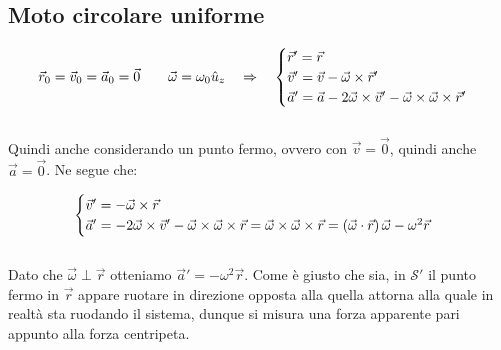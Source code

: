 \subsection{Moto circolare uniforme}

\begin{equation}
    \vec r_0 = \vec v_0 = \vec a_0 = \vec0
    \qquad \vec\omega = \omega_0\hat u_z
    \quad\Rightarrow\quad
    \begin{cases}
        \vec r' = \vec r\\
        \vec v' = \vec v - \vec\omega\times\vec r'\\
        \vec a' = \vec a - 2\vec\omega\times\vec v' -\vec\omega\times\vec\omega
        \times\vec r'
    \end{cases}
\end{equation}
\\
Quindi anche considerando un punto fermo, ovvero con $\vec v = \vec 0$, quindi
anche $\vec a = \vec 0$. Ne segue che:

\begin{equation}
    \begin{cases}
        \vec v' = - \vec\omega\times\vec r\\
        \vec a' = - 2\vec\omega\times\vec v' -\vec\omega\times\vec\omega
        \times\vec r = \vec\omega\times\vec\omega\times\vec r = 
        \left(\vec\omega\cdot\vec r\right)\vec\omega -\omega^2\vec r
    \end{cases}
\end{equation}
\\
Dato che $\vec\omega\perp\vec r$ otteniamo $\vec a' = -\omega^2\vec r$. Come
è giusto che sia, in $\mathcal{S'}$ il punto fermo in $\vec r$ appare ruotare
in direzione opposta alla quella attorna alla quale in realtà sta ruodando il
sistema, dunque si misura una forza apparente pari appunto alla forza centripeta.
